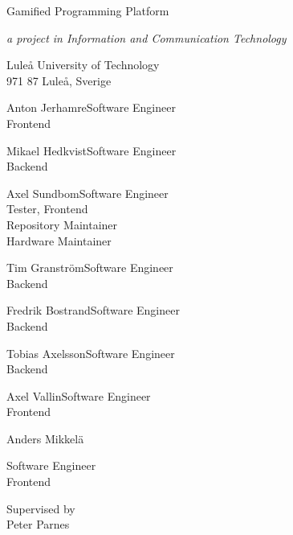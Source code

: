 \begin{center}
    {\LARGE Gamified Programming Platform}\par
    {\large\it a project in Information and Communication Technology}
    \vspace{\baselineskip}

    {\Large Luleå University of Technology}\\{\large 971 87 Luleå, Sverige}\par
\end{center}

\vfill

            {Anton Jerhamre}{Software Engineer \\ Frontend}

            {Mikael Hedkvist}{Software Engineer \\ Backend}

            {Axel Sundbom}{Software Engineer \\ Tester, Frontend \\ Repository Maintainer \\ Hardware Maintainer}

            {Tim Granström}{Software Engineer\\ Backend}

            {Fredrik Bostrand}{Software Engineer \\ Backend}

            {Tobias Axelsson}{Software Engineer \\ Backend}

            {Axel Vallin}{Software Engineer \\ Frontend}


\begin{center}
    \begin{member}
    \centering
    Anders Mikkelä\par
        Software Engineer \\
        Frontend
    \end{member}
\end{center}

\vfill

\begin{center}
    Supervised by\\ Peter Parnes
\end{center}
